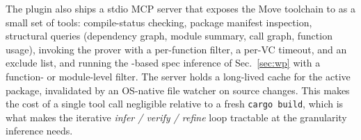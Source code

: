 The plugin also ships a stdio MCP server that exposes the Move toolchain to \CC as a small set of tools: compile-status checking, package manifest inspection, structural queries (dependency graph, module summary, call graph, function usage), invoking the prover with a per-function filter, a per-VC timeout, and an exclude list, and running the \WP-based spec inference of Sec.~\ref{sec:wp} with a function- or module-level filter.
The server holds a long-lived cache for the active package, invalidated by an OS-native file watcher on source changes.
This makes the cost of a single tool call negligible relative to a fresh \texttt{cargo build}, which is what makes the iterative \emph{infer / verify / refine} loop tractable at the granularity inference needs.

